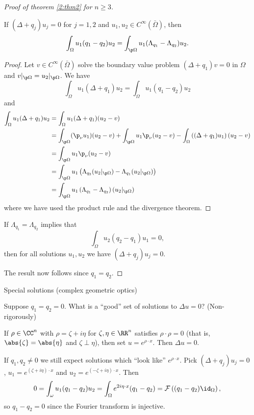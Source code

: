 \begin{proof}[Proof of theorem \ref{2:thm2} for $n \geq 3$]
  \begin{prop}
    If $(\Delta+q_j)u_j=0$ for $j=1,2$ and $u_1,u_2 \in C^\infty(\bar\Omega)$, then
    \[ \int_\Omega u_1(q_1-q_2)u_2 = \int_{\p\Omega} u_1(\Lambda_{q_1}-\Lambda_{q_2})u_2. \]
  \end{prop}

  \begin{proof}
    Let $v \in C^\infty(\bar\Omega)$ solve the boundary value problem $(\Delta+q_1)v=0$ in $\Omega$ and $v|_{\p\Omega}=u_2|_{\p\Omega}$.
    We have
    \[ \int_\Omega u_1(\Delta+q_1)u_2 = \int_\Omega u_1(q_1-q_2)u_2 \]
    and
    \begin{align*}
      \int_\Omega u_1(\Delta+q_1)u_2 &= \int_\Omega u_1(\Delta+q_1)(u_2-v) \\
      &= \int_{\p\Omega} (\p_\nu u_1)(u_2-v) + \int_{\p\Omega} u_1 \p_\nu(u_2-v) - \int_\Omega \left( (\Delta+q_1)u_1 \right)(u_2-v) \\
      &= \int_{\p\Omega} u_1 \p_\nu (u_2-v) \\
      &= \int_{\p\Omega} u_1\left( \Lambda_{q_2}(u_2|_{\p\Omega}) - \Lambda_{q_1}(u_2|_{\p\Omega}) \right) \\
      &= \int_{\p\Omega} u_1 \left( \Lambda_{q_1}-\Lambda_{q_2} \right)(u_2|_{\p\Omega})
    \end{align*}
    where we have used the product rule and the divergence theorem.
  \end{proof}

  \begin{cor}
    If $\Lambda_{q_1}=\Lambda_{q_2}$ implies that
    \[ \int_\Omega u_2(q_2-q_1)u_1=0, \]
    then for all solutions $u_1,u_2$ we have $(\Delta+q_j)u_j=0$.
  \end{cor}

  The result now follows since $q_1=q_2$.
\end{proof}

Special solutions (complex geometric optics)

Suppose $q_1=q_2=0$.
What is a ``good'' set of solutions to $\Delta u=0$?
(Non-rigorously)

If $\rho \in \CC^n$ with $\rho=\zeta+i\eta$ for $\zeta,\eta \in \RR^n$ satisfies $\rho \cdot \rho = 0$ (that is, $\abs{\zeta}=\abs{\eta}$ and $\zeta \perp \eta$), then set $u=e^{\rho\cdot x}$.
Then $\Delta u=0$.

If $q_1,q_2 \neq 0$ we still expect solutions which ``look like'' $e^{\rho \cdot x}$.
Pick $(\Delta+q_j)u_j=0$, $u_1=e^{ (\zeta+i\eta) \cdot x}$ and $u_2=e^{ (-\zeta+i\eta) \cdot x }$.
Then
\[ 0 = \int_\omega u_1(q_1-q_2)u_2 = \int_\Omega e^{2i\eta \cdot x} (q_1-q_2) = \mathcal{F} \left( (q_1-q_2)\id_\Omega \right), \]
so $q_1-q_2=0$ since the Fourier transform is injective.
